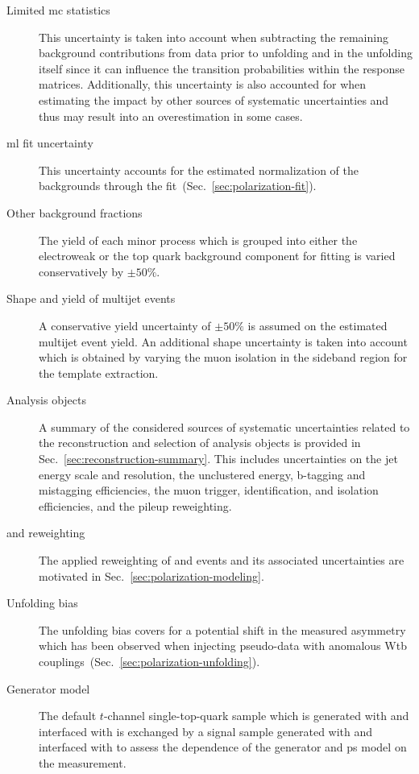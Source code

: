 \begin{description}
\item[Limited \gls{mc} statistics] This uncertainty is taken into account when subtracting the remaining background contributions from data prior to unfolding and in the unfolding itself since it can influence the transition probabilities within the response matrices. Additionally, this uncertainty is also accounted for when estimating the impact by other sources of systematic uncertainties and thus may result into an overestimation in some cases.

\item[\Gls{ml} fit uncertainty] This uncertainty accounts for the estimated normalization of the backgrounds through the fit~(Sec.~\ref{sec:polarization-fit}).

\item[Other background fractions] The yield of each minor process which is grouped into either the electroweak or the top quark background component for fitting is varied conservatively by $\pm50\%$.

\item[Shape and yield of multijet events] A conservative yield uncertainty of $\pm50\%$ is assumed on the estimated multijet event yield. An additional shape uncertainty is taken into account which is obtained by varying the muon isolation in the sideband region for the template extraction.

\item[Analysis objects] A summary of the considered sources of systematic uncertainties related to the reconstruction and selection of analysis objects is provided in Sec.~\ref{sec:reconstruction-summary}. This includes uncertainties on the jet energy scale and resolution, the unclustered energy, b-tagging and mistagging efficiencies, the muon trigger, identification, and isolation efficiencies, and the pileup reweighting.

\item[\wjets and \ttbar reweighting] The applied reweighting of \ttbar and \wjets events and its associated uncertainties are motivated in Sec.~\ref{sec:polarization-modeling}. 

\item[Unfolding bias] The unfolding bias covers for a potential shift in the measured asymmetry which has been observed when injecting pseudo-data with anomalous Wtb couplings~(Sec.~\ref{sec:polarization-unfolding}).

\item[Generator model] The default $t$-channel single-top-quark sample which is generated with \POWHEG and interfaced with  is exchanged by a signal sample generated with \AMC and interfaced with  to assess the dependence of the generator and \gls{ps} model on the measurement.


\end{description}
